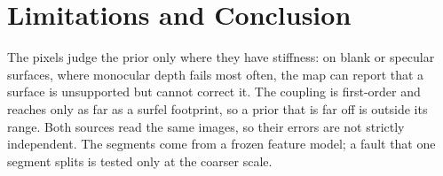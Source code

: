 \section{Limitations and Conclusion}
\label{sec:conclusion}
The pixels judge the prior only where they have stiffness: on blank or specular surfaces, where monocular
depth fails most often, the map can report that a surface is unsupported but cannot correct it. The
coupling is first-order and reaches only as far as a surfel footprint, so a prior that is far off is
outside its range. Both sources read the same images, so their errors are not strictly independent. The
segments come from a frozen feature model; a fault that one segment splits is tested only at the coarser
scale.
